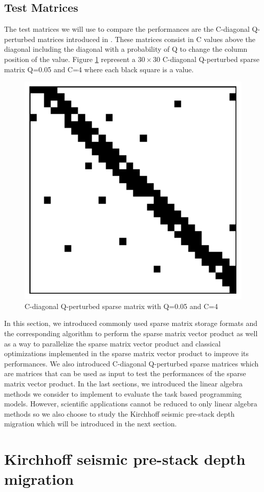 \subsection{Test Matrices}

The test matrices we will use to compare the performances are the C-diagonal Q-perturbed matrices introduced in \cite{HuguP2010}.
These matrices consist in C values above the diagonal including the diagonal with a probability of Q to change the column position of the value.
Figure \ref{fig:cqmat} represent a $30 \times 30$ C-diagonal Q-perturbed sparse matrix Q=0.05 and C=4 where each black square is a value.

\begin{figure}[H]
	\centering
	\includegraphics[width=.5\textwidth]{cqmat}
	\caption{C-diagonal Q-perturbed sparse matrix with Q=0.05 and C=4\label{fig:cqmat}}
\end{figure}

In this section, we introduced commonly used sparse matrix storage formats and the corresponding algorithm to perform the sparse matrix vector product as well as a way to parallelize the sparse matrix vector product and classical optimizations implemented in the sparse matrix vector product to improve its performances.
We also introduced C-diagonal Q-perturbed sparse matrices which are matrices that can be used as input to test the performances of the sparse matrix vector product.
In the last sections, we introduced the linear algebra methods we consider to implement to evaluate the task based programming models.
However, scientific applications cannot be reduced to only linear algebra methods so we also choose to study the Kirchhoff seismic pre-stack depth migration which will be introduced in the next section.

\section{Kirchhoff seismic pre-stack depth migration}

